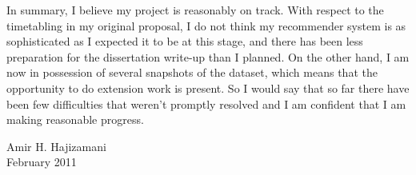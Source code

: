 \documentclass[a4paper,11pt,titlepage]{article}
\begin{document}
\bigskip

In summary, I believe my project is reasonably on track. With respect to the timetabling in my original proposal, I do not think my recommender system is as sophisticated as I expected it to be at this stage, and there has been less preparation for the dissertation write-up than I planned. On the other hand, I am now in possession of several snapshots of the dataset, which means that the opportunity to do extension work is present. So I would say that so far there have been few difficulties that weren't promptly resolved and I am confident that I am making reasonable progress.

\bigskip

\begin{flushright}
 Amir H. Hajizamani\\
 February 2011
\end{flushright}


\end{document}
